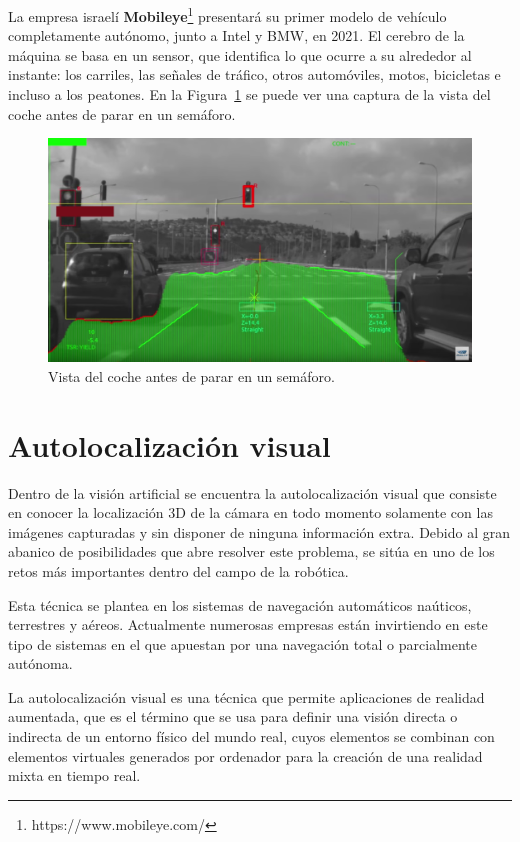 La empresa israelí \textbf{Mobileye}\footnote{https://www.mobileye.com/} presentará su primer modelo de vehículo completamente autónomo, junto a Intel y BMW, en 2021. El cerebro de la máquina se basa en un sensor, que identifica lo que ocurre a su alrededor al instante: los carriles, las señales de tráfico, otros automóviles, motos, bicicletas e incluso a los peatones. En la Figura~\ref{fig:Car} se puede ver una captura de la vista del coche antes de parar en un semáforo.

\begin{figure}[th]
\centering
\includegraphics[scale=0.3]{Figures/car.png}
\decoRule
\caption[Visión para la autoconducción]{Vista del coche antes de parar en un semáforo.}
\label{fig:Car}
\end{figure}


\section{Autolocalización visual}
Dentro de la visión artificial se encuentra la autolocalización visual que consiste en conocer la localización 3D de la cámara en todo momento solamente con las imágenes capturadas y sin disponer de ninguna información extra. Debido al gran abanico de posibilidades que abre resolver este problema, se sitúa en uno de los retos más importantes dentro del campo de la robótica.

Esta técnica se plantea en los sistemas de navegación automáticos naúticos, terrestres y aéreos. Actualmente numerosas empresas están invirtiendo en este tipo de sistemas en el que apuestan por una navegación total o parcialmente autónoma.

La autolocalización visual es una técnica que permite aplicaciones de realidad aumentada, que es el término que se usa para definir una visión directa o indirecta de un entorno físico del mundo real, cuyos elementos se combinan con elementos virtuales generados por ordenador para la creación de una realidad mixta en tiempo real.

